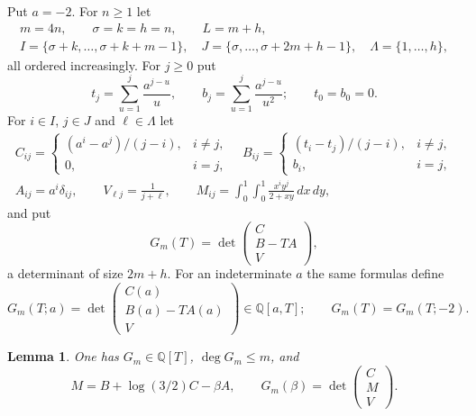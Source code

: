 \documentclass{amsart}
\newtheorem{lemma}{Lemma}[section]
\numberwithin{equation}{section}
\numberwithin{table}{section}
\begin{document}
Put $a=-2$. For $n\ge1$ let
\begin{equation*}
\begin{gathered}
m=4n,\qquad \sigma=k=h=n,\qquad L=m+h,\\
I=\{\sigma+k,\ldots,\sigma+k+m-1\},\quad
J=\{\sigma,\ldots,\sigma+2m+h-1\},\quad
\Lambda=\{1,\ldots,h\},
\end{gathered}
\end{equation*}
all ordered increasingly. For $j\ge0$ put
\[
t_j=\sum_{u=1}^{j}\frac{a^{j-u}}u,\qquad
b_j=\sum_{u=1}^{j}\frac{a^{j-u}}{u^2};\qquad t_0=b_0=0.
\]
For $i\in I$, $j\in J$ and $\ell\in\Lambda$ let
\begin{equation*}
\begin{gathered}
C_{ij}=\begin{cases}(a^i-a^j)/(j-i),&i\ne j,\\0,&i=j,\end{cases}
\quad
B_{ij}=\begin{cases}(t_i-t_j)/(j-i),&i\ne j,\\b_i,&i=j,\end{cases}\\
A_{ij}=a^i\delta_{ij},\qquad V_{\ell j}=\frac1{j+\ell},\qquad
M_{ij}=\int_0^1\!\int_0^1\frac{x^iy^j}{2+xy}\,dx\,dy,
\end{gathered}
\end{equation*}
and put
\begin{equation}\label{eq:determinant}
G_m(T)=\det\begin{pmatrix}C\\B-TA\\V\end{pmatrix},
\end{equation}
a determinant of size $2m+h$. For an indeterminate $a$ the same formulas
define
\[
G_m(T;a)=\det\begin{pmatrix}C(a)\\B(a)-TA(a)\\V\end{pmatrix}
\in\mathbb Q[a,T];\qquad G_m(T)=G_m(T;-2).
\]

\begin{lemma}\label{lem:moment-identity}
One has $G_m\in\mathbb Q[T]$, $\deg G_m\le m$, and
\begin{equation}\label{eq:moment-identity}
M=B+\log(3/2)C-\beta A,\qquad
G_m(\beta)=\det\begin{pmatrix}C\\M\\V\end{pmatrix}.
\end{equation}
\end{lemma}
\end{document}
